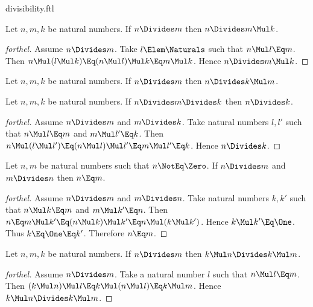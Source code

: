 \documentclass{stex}
\begin{document}
\begin{smodule}{divisibility.ftl}
\begin{proposition*}[forthel]
  Let $n, m, k$ be natural numbers.
  If $n \Divides m$ then $n \Divides m \Mul k$.
\end{proposition*}
\begin{proof}[forthel]
  Assume $n \Divides m$.
  Take $l \Elem \Naturals$ such that $n \Mul l \Eq m$.
  Then $n \Mul (l \Mul k)
    \Eq (n \Mul l) \Mul k
    \Eq m \Mul k$.
  Hence $n \Divides m \Mul k$.
\end{proof}

\begin{proposition*}[forthel]
  Let $n, m, k$ be natural numbers.
  If $n \Divides m$ then $n \Divides k \Mul m$.
\end{proposition*}

\begin{proposition*}[forthel]
  Let $n, m, k$ be natural numbers.
  If $n \Divides m \Divides k$ then $n \Divides k$.
\end{proposition*}
\begin{proof}[forthel]
  Assume $n \Divides m$ and $m \Divides k$.
  Take natural numbers $l,l'$ such that $n \Mul l \Eq m$ and $m \Mul l' \Eq k$.
  Then $n \Mul (l \Mul l')
    \Eq (n \Mul l) \Mul l'
    \Eq m \Mul l'
    \Eq k$.
  Hence $n \Divides k$.
\end{proof}

\begin{proposition*}[forthel]
  Let $n, m$ be natural numbers such that $n \NotEq \Zero$.
  If $n \Divides m$ and $m \Divides n$ then $n \Eq m$.
\end{proposition*}
\begin{proof}[forthel]
  Assume $n \Divides m$ and $m \Divides n$.
  Take natural numbers $k,k'$ such that $n \Mul k \Eq m$ and $m \Mul k' \Eq n$.
  Then $n
    \Eq m \Mul k'
    \Eq (n \Mul k) \Mul k'
    \Eq n \Mul (k \Mul k')$.
  Hence $k \Mul k' \Eq \One$.
  Thus $k \Eq \One \Eq k'$.
  Therefore $n \Eq m$.
\end{proof}

\begin{proposition*}[forthel]
  Let $n, m, k$ be natural numbers.
  If $n \Divides m$ then $k \Mul n \Divides k \Mul m$.
\end{proposition*}
\begin{proof}[forthel]
  Assume $n \Divides m$.
  Take a natural number $l$ such that $n \Mul l \Eq m$.
  Then $(k \Mul n) \Mul l
    \Eq k \Mul (n \Mul l)
    \Eq k \Mul m$.
  Hence $k \Mul n \Divides k \Mul m$.
\end{proof}


\end{smodule}
\end{document}
